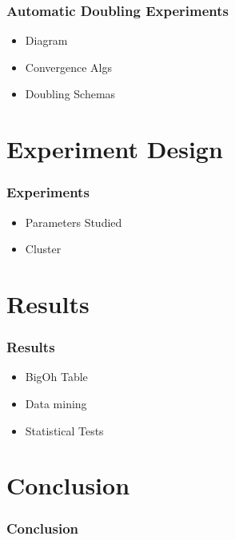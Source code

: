 \documentclass[hyperref]{beamer}
\begin{document}
      \begin{frame}
        \frametitle{Automatic Doubling Experiments}
        \begin{itemize}
          \item Diagram
          \item Convergence Algs
          \item Doubling Schemas
        \end{itemize}
      \end{frame}

    \section{Experiment Design}
      \begin{frame}
        \frametitle{Experiments}
        \begin{itemize}
          \item Parameters Studied
          \item Cluster
        \end{itemize}
      \end{frame}

    \section{Results}
      \begin{frame}
        \frametitle{Results}
        \begin{itemize}
          \item BigOh Table
          \item Data mining
          \item Statistical Tests
        \end{itemize}
      \end{frame}

    \section{Conclusion}
      \begin{frame}
        \frametitle{Conclusion}
      \end{frame}


      
\end{document}
